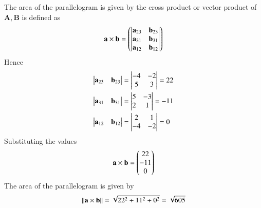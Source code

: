 \documentclass[journal,12pt,twocolumn]{IEEEtran}
\renewcommand{\vec}[1]{\boldsymbol{\mathbf{#1}}}
\begin{document}
The area of the parallelogram is given by the cross product or vector product of $\vec{A},\vec{B}$ is defined as
\begin{align}
    \vec{a} \times \vec{b} = \myvec{\mydet{\vec{a}_{23} & \vec{b}_{23} \\\vec{a}_{31}&\vec{b}_{31}\\\vec{a}_{12}&\vec{b}_{12}}}
\end{align}
Hence
\begin{align}
    \mydet{\vec{a}_{23} & \vec{b}_{23}} & =\mydet{-4 & -2 \\5&\-3}=22\\
    \mydet{\vec{a}_{31} & \vec{b}_{31}} & =\mydet{5  & -3 \\2&1}=-11\\
    \mydet{\vec{a}_{12} & \vec{b}_{12}} & =\mydet{2  & 1  \\-4&-2}=0
\end{align}
Substituting the values
\begin{align}
    \vec{a}\times\vec{b}=\myvec{22 \\-11\\0}
\end{align}
The area of the parallelogram is given by
\begin{align}
    \norm{\vec{a}\times\vec{b}} = \sqrt{22^2 + 11^2 + 0^2} = \sqrt{605}
\end{align}
\end{document}

